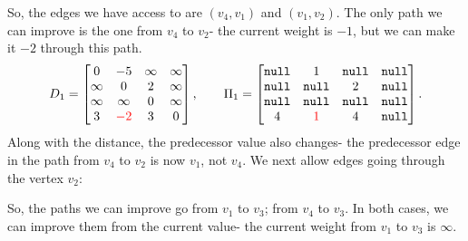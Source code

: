 \documentclass[a4paper, openany]{memoir}
\begin{document}
    \noindent So, the edges we have access to are $(v_4, v_1)$ and $(v_1, v_2)$. The only path we can improve is the one from $v_4$ to $v_2$- the current weight is $-1$, but we can make it $-2$ through this path.
    \[D_1 = \begin{bmatrix}
        0 & -5 & \infty & \infty \\
        \infty & 0 & 2 & \infty \\
        \infty & \infty & 0 & \infty \\
        3 & {\color{red} -2} & 3 & 0
    \end{bmatrix}, \qquad \Pi_1 = \begin{bmatrix}
        \texttt{null} & 1 & \texttt{null} & \texttt{null} \\
        \texttt{null} & \texttt{null} & 2 & \texttt{null} \\
        \texttt{null} & \texttt{null} & \texttt{null} & \texttt{null} \\
        4 & {\color{red} 1} & 4 & \texttt{null}
    \end{bmatrix}.\]
    \noindent Along with the distance, the predecessor value also changes- the predecessor edge in the path from $v_4$ to $v_2$ is now $v_1$, not $v_4$. We next allow edges going through the vertex $v_2$:
    \begin{figure}[H]
        \centering
    \end{figure}
    \noindent So, the paths we can improve go from $v_1$ to $v_3$; from $v_4$ to $v_3$. In both cases, we can improve them from the current value- the current weight from $v_1$ to $v_3$ is $\infty$. 
\end{document}
